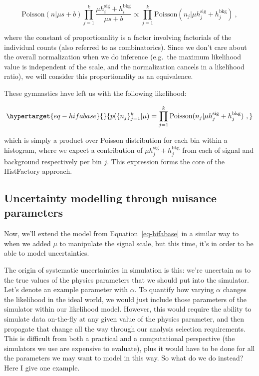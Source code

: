 \documentclass[
  11pt,
  numbers=noendperiod]{book}
\begin{document}
\[
\mathrm{Poisson}(n|\mu s+b)\prod_{j=1}^k\frac{\mu h^{\mathrm{sig}}_i  + h^{\mathrm{bkg}}_i}{\mu s+b} \propto \prod_{j=1}^k \mathrm{Poisson}(n_j | \mu h^{\mathrm{sig}}_j  + h^{\mathrm{bkg}}_j)~,
\]

where the constant of proportionality is a factor involving factorials
of the individual counts (also referred to as combinatorics). Since we
don't care about the overall normalization when we do inference
(e.g.~the maximum likelihood value is independent of the scale, and the
normalization cancels in a likelihood ratio), we will consider this
proportionality as an equivalence.

These gymnastics have left us with the following likelihood:

\begin{equation}\protect\hypertarget{eq-hifabase}{}{
p(\{n_j\}_{j=1}^k | \mu) = \prod_{j=1}^k \mathrm{Poisson}(n_j | \mu h^{\mathrm{sig}}_j  + h^{\mathrm{bkg}}_j)~,
}\label{eq-hifabase}\end{equation}

which is simply a product over Poisson distribution for each bin within
a histogram, where we expect a contribution of
\(\mu h^{\mathrm{sig}}_j + h^{\mathrm{bkg}}_j\) from each of signal and
background respectively per bin \(j\). This expression forms the core of
the HistFactory approach.

\hypertarget{sec-hifa-nps}{%
\subsection{Uncertainty modelling through nuisance
parameters}\label{sec-hifa-nps}}

Now, we'll extend the model from Equation~\ref{eq-hifabase} in a similar
way to when we added \(\mu\) to manipulate the signal scale, but this
time, it's in order to be able to model uncertainties.

The origin of systematic uncertainties in simulation is this: we're
uncertain as to the true values of the physics parameters that we should
put into the simulator. Let's denote an example parameter with
\(\alpha\). To quantify how varying \(\alpha\) changes the likelihood in
the ideal world, we would just include those parameters of the simulator
within our likelihood model. However, this would require the ability to
simulate data on-the-fly at any given value of the physics parameter,
and then propagate that change all the way through our analysis
selection requirements. This is difficult from both a practical and a
computational perspective (the simulators we use are expensive to
evaluate), plus it would have to be done for all the parameters we may
want to model in this way. So what do we do instead? Here I give one
example.
\end{document}
